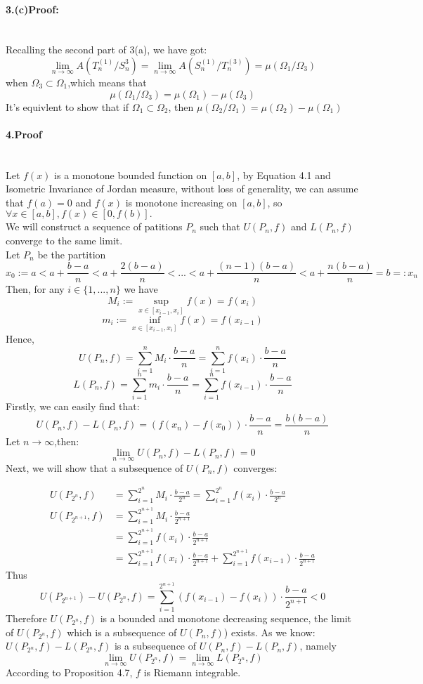 \documentclass{article}
\begin{document}
\paragraph{3.(c)Proof:}\ \\Recalling the second part of 3(a), we have got:
$$ \lim_{n\to\infty}A(T_n^{(1)}\slash S_n^{3})
=\lim_{n\to\infty}A(S_n^{(1)}\slash T_n^{(3)})=\mu(\Omega_1\slash\Omega_3)$$
when $\Omega_3\subset\Omega_1$,which means that
$$\mu(\Omega_1\slash\Omega_3)=\mu(\Omega_1)-\mu(\Omega_3)$$
It's equivlent to show that if $\Omega_1\subset \Omega_2$, then 
$\mu(\Omega_2\slash\Omega_1)=\mu(\Omega_2)-\mu(\Omega_1)$




\paragraph{4.Proof} \ \\
Let $f(x)$ is a monotone bounded function on $[a, b]$,
 by Equation 4.1 and Isometric Invariance of Jordan measure, without loss of generality, we can 
 assume that $f(a)=0$ and $f(x)$ is monotone increasing on $[a,b]$, so
 $\forall x\in [a,b],f(x)\in [0,f(b)].$\\
 We will construct a sequence of patitions $P_n$ such that
 $U(P_n,f)$ and $L(P_n,f)$ converge to the same limit.\\
 Let $P_n$ be the partition $$
 x_0:=a<a+\frac{b-a}{n}<a+\frac{2(b-a)}{n}<.
 ..<a+\frac{(n-1)(b-a)}{n}<a+\frac{n(b-a)}{n}=b=:x_n$$
Then, for any $i\in \{1,...,n\}$ we have
$$M_i:= \sup_{x\in [x_{i-1},x_i]} f(x)=f(x_i)
$$
$$m_i:= \inf_{x\in [x_{i-1},x_i]} f(x)=f(x_{i-1})
$$
Hence,
$$
U(P_n,f)=\sum_{i=1}^{n}M_i\cdot \frac{b-a}{n}
=\sum_{i=1}^{n}f(x_i)\cdot\frac{b-a}{n}$$
$$
L(P_n,f)=\sum_{i=1}^{n}m_i\cdot \frac{b-a}{n}
=\sum_{i=1}^{n}f(x_{i-1})\cdot\frac{b-a}{n}$$
Firstly, we can easily find that:
$$U(P_n,f)-L(P_n,f)=(f(x_n)-f(x_0))\cdot\frac{b-a}{n}=\frac{b(b-a)}{n}$$
Let $n\to\infty$,then:
$$\lim_{n\to\infty}U(P_n,f)-L(P_n,f)=0$$
Next, we will show that a subsequence of $U(P_n,f)$ converges:

\begin{align*}
    U(P_{2^n},f)&=\sum_{i=1}^{2^n}M_i\cdot \frac{b-a}{2^n}
=\sum_{i=1}^{2^n}f(x_i)\cdot\frac{b-a}{2^n}\\
U(P_{2^{n+1}},f)&=\sum_{i=1}^{2^{n+1}}M_i\cdot \frac{b-a}{2^{n+1}}
\\&=\sum_{i=1}^{2^{n+1}}f(x_i)\cdot\frac{b-a}{2^{n+1}}\\
&= \sum_{i=1}^{2^{n+1}}f(x_i)\cdot\frac{b-a}{2^{n+1}}+
\sum_{i=1}^{2^{n+1}}f(x_{i-1})\cdot\frac{b-a}{2^{n+1}}
\end{align*}
Thus 
$$U(P_{2^{n+1}})-U(P_{2^n},f)=\sum_{i=1}^{2^{n+1}}(f(x_{i-1})-f(x_i))\cdot\frac{b-a}{2^{n+1}}<0$$
Therefore $U(P_{2^n},f)$ is a bounded and monotone decreasing sequence, the limit of 
$U(P_{2^n},f)$ which is a subsequence of $U(P_n,f)$) exists.
As we know:
$U(P_{2^n},f)-L(P_{2^n},f)$ is a subsequence of $U(P_n,f)-L(P_n,f)$,
namely
$$\lim_{n\to\infty}U(P_{2^n},f)=\lim_{n\to\infty}L(P_{2^n},f)$$
According to Proposition 4.7, $f$ is Riemann integrable.








 
\end{document}
